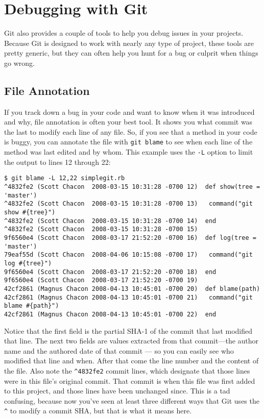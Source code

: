 \documentclass[a4paper]{book}
\begin{document}
\section{Debugging with Git}

Git also provides a couple of tools to help you debug issues in your projects. Because Git is designed to work with nearly any type of project, these tools are pretty generic, but they can often help you hunt for a bug or culprit when things go wrong.

\subsection{File Annotation}

If you track down a bug in your code and want to know when it was introduced and why, file annotation is often your best tool. It shows you what commit was the last to modify each line of any file. So, if you see that a method in your code is buggy, you can annotate the file with \texttt{git blame} to see when each line of the method was last edited and by whom. This example uses the \texttt{-L} option to limit the output to lines 12 through 22:

\begin{shaded}\begin{verbatim}
$ git blame -L 12,22 simplegit.rb
^4832fe2 (Scott Chacon  2008-03-15 10:31:28 -0700 12)  def show(tree = 'master')
^4832fe2 (Scott Chacon  2008-03-15 10:31:28 -0700 13)   command("git show #{tree}")
^4832fe2 (Scott Chacon  2008-03-15 10:31:28 -0700 14)  end
^4832fe2 (Scott Chacon  2008-03-15 10:31:28 -0700 15)
9f6560e4 (Scott Chacon  2008-03-17 21:52:20 -0700 16)  def log(tree = 'master')
79eaf55d (Scott Chacon  2008-04-06 10:15:08 -0700 17)   command("git log #{tree}")
9f6560e4 (Scott Chacon  2008-03-17 21:52:20 -0700 18)  end
9f6560e4 (Scott Chacon  2008-03-17 21:52:20 -0700 19)
42cf2861 (Magnus Chacon 2008-04-13 10:45:01 -0700 20)  def blame(path)
42cf2861 (Magnus Chacon 2008-04-13 10:45:01 -0700 21)   command("git blame #{path}")
42cf2861 (Magnus Chacon 2008-04-13 10:45:01 -0700 22)  end
\end{verbatim}\end{shaded}

Notice that the first field is the partial SHA-1 of the commit that last modified that line. The next two fields are values extracted from that commit---the author name and the authored date of that commit --- so you can easily see who modified that line and when. After that come the line number and the content of the file. Also note the \texttt{\^{}4832fe2} commit lines, which designate that those lines were in this file's original commit. That commit is when this file was first added to this project, and those lines have been unchanged since. This is a tad confusing, because now you've seen at least three different ways that Git uses the \texttt{\^{}} to modify a commit SHA, but that is what it means here.
\end{document}
